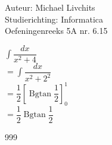 \documentclass[a4paper]{article}
\begin{document}
  
\noindent \large Auteur: Michael Livchits \\
\noindent \large Studierichting:  Informatica\\
\noindent \large Oefeningenreeks 5A nr. 6.15\\

\medskip

\newcommand{\Bgtan}{\operatorname{Bgtan}}

\normalsize

$ \displaystyle\int \dfrac{dx}{x^2+4}$\\

$ = \displaystyle\int \dfrac{dx}{x^2+2^2}$\\

$= \dfrac{1}{2}\left[\Bgtan\dfrac{1}{2}\right]_{0}^{1}$\\

$= \dfrac{1}{2}\Bgtan\dfrac{1}{2}$\\

\begin{thebibliography}{999}
\end{thebibliography}
\end{document}
